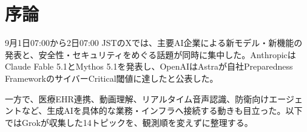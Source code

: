 \section*{序論}
9月1日07:00から2日07:00 JSTのXでは、主要AI企業による新モデル・新機能の発表と、安全性・セキュリティをめぐる話題が同時に集中した。AnthropicはClaude Fable 5.1とMythos 5.1を発表し、OpenAIはAstraが自社Preparedness FrameworkのサイバーCritical閾値に達したと公表した。

一方で、医療EHR連携、動画理解、リアルタイム音声認識、防衛向けエージェントなど、生成AIを具体的な業務・インフラへ接続する動きも目立った。以下ではGrokが収集した14トピックを、観測順を変えずに整理する。
